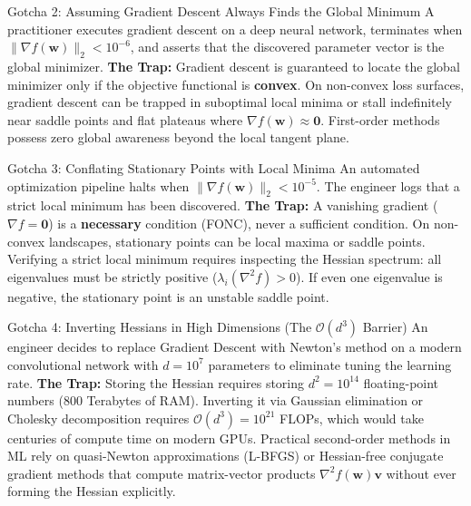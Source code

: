 \begin{trapbox}{Gotcha 2: Assuming Gradient Descent Always Finds the Global Minimum}
A practitioner executes gradient descent on a deep neural network, terminates when $\|\nabla f(\mathbf{w})\|_2 < 10^{-6}$, and asserts that the discovered parameter vector is the global minimizer.
\tcblower
\textbf{The Trap:} Gradient descent is guaranteed to locate the global minimizer only if the objective functional is \textbf{convex}. On non-convex loss surfaces, gradient descent can be trapped in suboptimal local minima or stall indefinitely near saddle points and flat plateaus where $\nabla f(\mathbf{w}) \approx \mathbf{0}$. First-order methods possess zero global awareness beyond the local tangent plane.
\end{trapbox}

\begin{trapbox}{Gotcha 3: Conflating Stationary Points with Local Minima}
An automated optimization pipeline halts when $\|\nabla f(\mathbf{w})\|_2 < 10^{-5}$. The engineer logs that a strict local minimum has been discovered.
\tcblower
\textbf{The Trap:} A vanishing gradient ($\nabla f = \mathbf{0}$) is a \textbf{necessary} condition (FONC), never a sufficient condition. On non-convex landscapes, stationary points can be local maxima or saddle points. Verifying a strict local minimum requires inspecting the Hessian spectrum: all eigenvalues must be strictly positive ($\lambda_i(\nabla^2 f) > 0$). If even one eigenvalue is negative, the stationary point is an unstable saddle point.
\end{trapbox}

\begin{trapbox}{Gotcha 4: Inverting Hessians in High Dimensions (The $\mathcal{O}(d^3)$ Barrier)}
An engineer decides to replace Gradient Descent with Newton's method on a modern convolutional network with $d = 10^7$ parameters to eliminate tuning the learning rate.
\tcblower
\textbf{The Trap:} Storing the Hessian requires storing $d^2 = 10^{14}$ floating-point numbers ($800$ Terabytes of RAM). Inverting it via Gaussian elimination or Cholesky decomposition requires $\mathcal{O}(d^3) = 10^{21}$ FLOPs, which would take centuries of compute time on modern GPUs. Practical second-order methods in ML rely on quasi-Newton approximations (L-BFGS) or Hessian-free conjugate gradient methods that compute matrix-vector products $\nabla^2 f(\mathbf{w})\mathbf{v}$ without ever forming the Hessian explicitly.
\end{trapbox}

